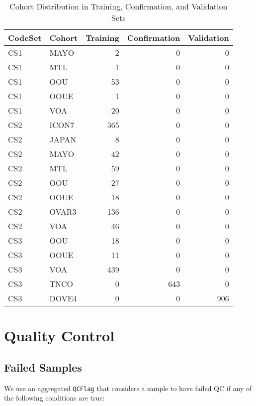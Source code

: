 \documentclass[
]{report}
\begin{document}
\begin{table}

\caption{\label{tab:cohort-dist}Cohort Distribution in Training, Confirmation, and Validation Sets}
\centering
\begin{tabular}[t]{l|l|r|r|r}
\hline
CodeSet & Cohort & Training & Confirmation & Validation\\
\hline
CS1 & MAYO & 2 & 0 & 0\\
\hline
CS1 & MTL & 1 & 0 & 0\\
\hline
CS1 & OOU & 53 & 0 & 0\\
\hline
CS1 & OOUE & 1 & 0 & 0\\
\hline
CS1 & VOA & 20 & 0 & 0\\
\hline
CS2 & ICON7 & 365 & 0 & 0\\
\hline
CS2 & JAPAN & 8 & 0 & 0\\
\hline
CS2 & MAYO & 42 & 0 & 0\\
\hline
CS2 & MTL & 59 & 0 & 0\\
\hline
CS2 & OOU & 27 & 0 & 0\\
\hline
CS2 & OOUE & 18 & 0 & 0\\
\hline
CS2 & OVAR3 & 136 & 0 & 0\\
\hline
CS2 & VOA & 46 & 0 & 0\\
\hline
CS3 & OOU & 18 & 0 & 0\\
\hline
CS3 & OOUE & 11 & 0 & 0\\
\hline
CS3 & VOA & 439 & 0 & 0\\
\hline
CS3 & TNCO & 0 & 643 & 0\\
\hline
CS3 & DOVE4 & 0 & 0 & 906\\
\hline
\end{tabular}
\end{table}

\hypertarget{quality-control}{%
\section{Quality Control}\label{quality-control}}

\hypertarget{failed-samples}{%
\subsection{Failed Samples}\label{failed-samples}}

We use an aggregated \texttt{QCFlag} that considers a sample to have failed QC if any of the following conditions are true:
\end{document}

